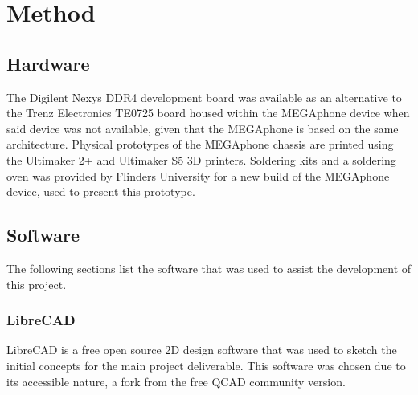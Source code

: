 
\chapter{Method} %

\label{Chapter3} %


\section{Hardware}

The Digilent Nexys DDR4 development board was available as an alternative to the Trenz Electronics TE0725 board housed within the MEGAphone device when said device was not available, given that the MEGAphone is based on the same architecture. 
Physical prototypes of the MEGAphone chassis are printed using the Ultimaker 2+ and Ultimaker S5 3D printers. 
Soldering kits and a soldering oven was provided by Flinders University for a new build of the MEGAphone device, used to present this prototype.


\section{Software}

The following sections list the software that was used to assist the development of this project.


\subsection{LibreCAD}

LibreCAD is a free open source 2D design software that was used to sketch the initial concepts for the main project deliverable. 
This software was chosen due to its accessible nature, a fork from the free QCAD community version.


